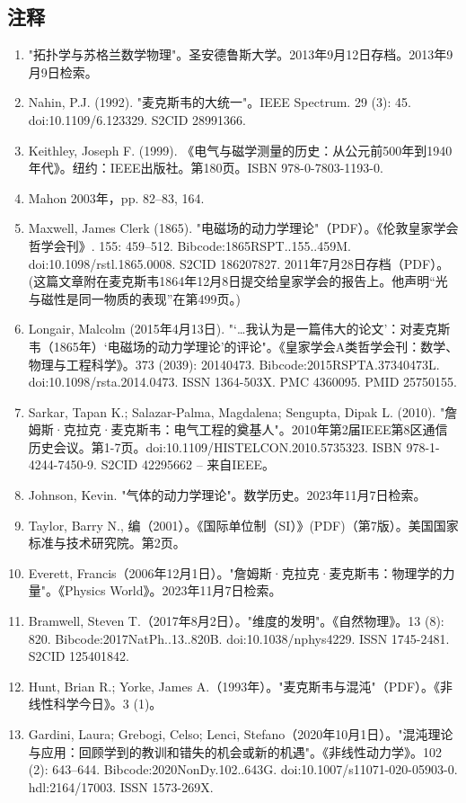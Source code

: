 \subsection{注释}  
\begin{enumerate}
\item "拓扑学与苏格兰数学物理"。圣安德鲁斯大学。2013年9月12日存档。2013年9月9日检索。  
\item Nahin, P.J. (1992). "麦克斯韦的大统一"。IEEE Spectrum. 29 (3): 45. doi:10.1109/6.123329. S2CID 28991366.  
\item Keithley, Joseph F. (1999). 《电气与磁学测量的历史：从公元前500年到1940年代》。纽约：IEEE出版社。第180页。ISBN 978-0-7803-1193-0.  
\item Mahon 2003年，pp. 82–83, 164.  
\item Maxwell, James Clerk (1865). "电磁场的动力学理论"（PDF）。《伦敦皇家学会哲学会刊》. 155: 459–512. Bibcode:1865RSPT..155..459M. doi:10.1098/rstl.1865.0008. S2CID 186207827. 2011年7月28日存档（PDF）。(这篇文章附在麦克斯韦1864年12月8日提交给皇家学会的报告上。他声明“光与磁性是同一物质的表现”在第499页。)  
\item Longair, Malcolm (2015年4月13日). "‘…我认为是一篇伟大的论文’：对麦克斯韦（1865年）‘电磁场的动力学理论’的评论"。《皇家学会A类哲学会刊：数学、物理与工程科学》。373 (2039): 20140473. Bibcode:2015RSPTA.37340473L. doi:10.1098/rsta.2014.0473. ISSN 1364-503X. PMC 4360095. PMID 25750155.  
\item Sarkar, Tapan K.; Salazar-Palma, Magdalena; Sengupta, Dipak L. (2010). "詹姆斯·克拉克·麦克斯韦：电气工程的奠基人"。2010年第2届IEEE第8区通信历史会议。第1-7页。doi:10.1109/HISTELCON.2010.5735323. ISBN 978-1-4244-7450-9. S2CID 42295662 – 来自IEEE。
\item Johnson, Kevin. "气体的动力学理论"。数学历史。2023年11月7日检索。  
\item Taylor, Barry N., 编（2001）。《国际单位制（SI）》(PDF)（第7版）。美国国家标准与技术研究院。第2页。  
\item Everett, Francis（2006年12月1日）。"詹姆斯·克拉克·麦克斯韦：物理学的力量"。《Physics World》。2023年11月7日检索。  
\item Bramwell, Steven T.（2017年8月2日）。"维度的发明"。《自然物理》。13 (8): 820. Bibcode:2017NatPh..13..820B. doi:10.1038/nphys4229. ISSN 1745-2481. S2CID 125401842.  
\item Hunt, Brian R.; Yorke, James A.（1993年）。"麦克斯韦与混沌"（PDF）。《非线性科学今日》。3 (1)。  
\item Gardini, Laura; Grebogi, Celso; Lenci, Stefano（2020年10月1日）。"混沌理论与应用：回顾学到的教训和错失的机会或新的机遇"。《非线性动力学》。102 (2): 643–644. Bibcode:2020NonDy.102..643G. doi:10.1007/s11071-020-05903-0. hdl:2164/17003. ISSN 1573-269X.  

\end{enumerate}
